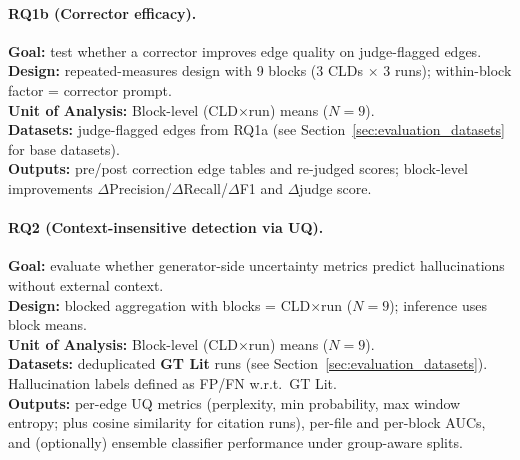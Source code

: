 \paragraph{RQ1b (Corrector efficacy).}
\begin{center}
\end{center}
\vspace{-0.8em}
\textbf{Goal:} test whether a corrector improves edge quality on judge-flagged edges.\\
\textbf{Design:} repeated-measures design with 9 blocks (3 CLDs $\times$ 3 runs); within-block factor = corrector prompt.\\
\textbf{Unit of Analysis:} Block-level (CLD$\times$run) means ($N=9$).\\
\textbf{Datasets:} judge-flagged edges from RQ1a (see Section~\ref{sec:evaluation_datasets} for base datasets).\\
\textbf{Outputs:} pre/post correction edge tables and re-judged scores; block-level improvements \(\Delta\)Precision/\(\Delta\)Recall/\(\Delta\)F1 and \(\Delta\)judge score.

\paragraph{RQ2 (Context-insensitive detection via UQ).}
\begin{center}
\end{center}
\vspace{-0.8em}
\textbf{Goal:} evaluate whether generator-side uncertainty metrics predict hallucinations without external context.\\
\textbf{Design:} blocked aggregation with blocks = CLD$\times$run ($N=9$); inference uses block means.\\
\textbf{Unit of Analysis:} Block-level (CLD$\times$run) means ($N=9$).\\
\textbf{Datasets:} deduplicated \textbf{GT Lit} runs (see Section~\ref{sec:evaluation_datasets}). Hallucination labels defined as FP/FN w.r.t.\ GT Lit.\\
\textbf{Outputs:} per-edge UQ metrics (perplexity, min probability, max window entropy; plus cosine similarity for citation runs), per-file and per-block AUCs, and (optionally) ensemble classifier performance under group-aware splits.

